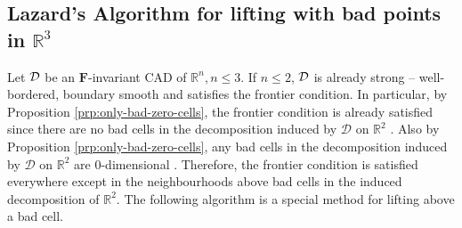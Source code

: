 \documentclass[
]{book}
\theoremstyle{definition}
\theoremstyle{definition}
\theoremstyle{definition}
\theoremstyle{definition}
\theoremstyle{remark}
\begin{document}
\hypertarget{lazards-algorithm-for-lifting-with-bad-points-in-mathbbr3}{%
\subsection{\texorpdfstring{Lazard's Algorithm for lifting with bad points in \(\mathbb{R}^3\)}{Lazard's Algorithm for lifting with bad points in \textbackslash mathbb\{R\}\^{}3}}\label{lazards-algorithm-for-lifting-with-bad-points-in-mathbbr3}}

Let \(\cal D\) be an \(\mathbf{F}\)-invariant CAD of \(\mathbb{R}^n, n \le 3\). If \(n \le 2\), \(\cal D\) is already strong -- well-bordered, boundary smooth and satisfies the frontier condition. In particular, by Proposition \ref{prp:only-bad-zero-cells}, the frontier condition is already satisfied since there are no bad cells in the decomposition induced by \(\mathcal{D}\) on \(\mathbb{R}^2\) \citep[Lemma 4.3]{lazard10}.
Also by Proposition \ref{prp:only-bad-zero-cells}, any bad cells in the decomposition induced by \(\mathcal{D}\) on \(\mathbb{R}^2\) are \(0\)-dimensional \citep[Lemma 4.3]{lazard10}.
Therefore, the frontier condition is satisfied everywhere except in the neighbourhoods above bad cells in the induced decomposition of \(\mathbb{R}^2\). The following algorithm is a special method for lifting above a bad cell.
\end{document}

